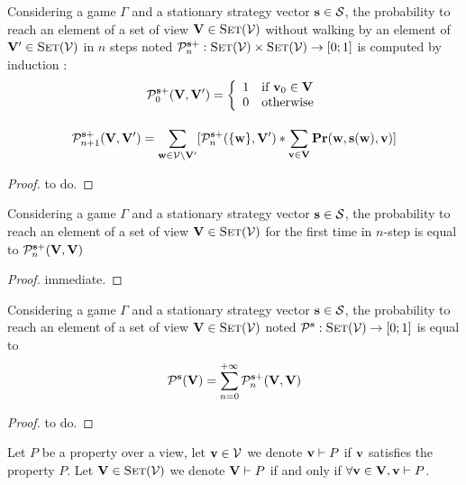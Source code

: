 \begin{mylem}
	Considering a game $\Gamma$ and a stationary strategy vector $\mathbf{s} \in \mathcal{S}$, 
	the probability to reach an element of a set of view $\mathbf{V} \in \text{\sc Set}(\mathcal{V})$  without walking by an element of $\mathbf{V}' \in \text{\sc Set}(\mathcal{V})$ in $n$ steps noted $\mathcal{P}^{\mathbf{s}+}_n : \text{\sc Set}(\mathcal{V}) \times \text{\sc Set}(\mathcal{V}) \rightarrow [0;1]$ is computed by induction :
	$$\mathcal{P}^{\mathbf{s}+}_0(\mathbf{V},\mathbf{V}') = \left\{\begin{array}{ll}
	1 & \mbox{if } \mathbf{v}_0 \in \mathbf{V} \\
	0 & \mbox{otherwise}
	\end{array}\right.$$
	
	$$\mathcal{P}^{\mathbf{s}+}_{n+1}(\mathbf{V},\mathbf{V}') = \sum_{\mathbf{w} \in \mathcal{V} \setminus \mathbf{V}'}   [\mathcal{P}^{\mathbf{s}+}_{n}(\{\mathbf{w}\},\mathbf{V}') * \sum_{\mathbf{v} \in \mathbf{V}}^{}\mathbf{Pr}(\mathbf{w},\mathbf{s}(\mathbf{w}),\mathbf{v}) ]$$
\end{mylem}

\begin{proof}
	to do.
\end{proof}

\begin{mylem}
	Considering a game $\Gamma$ and a stationary strategy vector $\mathbf{s} \in \mathcal{S}$, 
	the probability to reach an element of a set of view $\mathbf{V} \in \text{\sc Set}(\mathcal{V})$ for the first time in $n$-step is equal to $\mathcal{P}^{\mathbf{s}+}_n(\mathbf{V},\mathbf{V})$
\end{mylem}

\begin{proof}
	immediate.
\end{proof}

\begin{myprop}
	Considering a game $\Gamma$ and a stationary strategy vector $\mathbf{s} \in \mathcal{S}$, 
	the probability to reach an element of a set of view $\mathbf{V} \in \text{\sc Set}(\mathcal{V})$ noted  $\mathcal{P}^{\mathbf{s}} : \text{\sc Set}(\mathcal{V}) \rightarrow [0;1]$ is equal to $$\mathcal{P}^{\mathbf{s}}(\mathbf{V}) = \sum_{n=0}^{+\infty}\mathcal{P}^{\mathbf{s}+}_n(\mathbf{V},\mathbf{V})$$
\end{myprop}

\begin{proof}
	to do.
\end{proof}

\begin{mydef}
	Let $P$ be a property over a view, let $\mathbf{v} \in \mathcal{V}$ we denote $\mathbf{v} \vdash P$ if $\mathbf{v}$ satisfies the property $P$. Let $\mathbf{V} \in \text{\sc Set}(\mathcal{V})$ we denote $\mathbf{V} \vdash P$ if and only if $\forall \mathbf{v} \in \mathbf{V}, \mathbf{v} \vdash P$.
\end{mydef}

